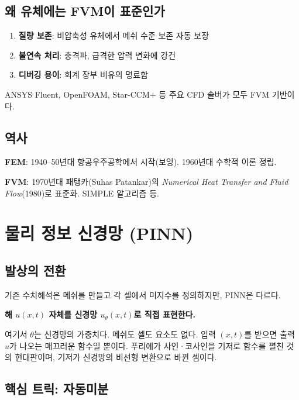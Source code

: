\documentclass[11pt,a4paper]{article}
\begin{document}
\subsection{왜 유체에는 FVM이 표준인가}

\begin{enumerate}[leftmargin=*, itemsep=1pt]
  \item \textbf{질량 보존}: 비압축성 유체에서 메쉬 수준 보존 자동 보장
  \item \textbf{불연속 처리}: 충격파, 급격한 압력 변화에 강건
  \item \textbf{디버깅 용이}: 회계 장부 비유의 명료함
\end{enumerate}

ANSYS Fluent, OpenFOAM, Star-CCM+ 등 주요 CFD 솔버가 모두 FVM 기반이다.

\subsection{역사}

\textbf{FEM}: 1940--50년대 항공우주공학에서 시작(보잉). 1960년대 수학적 이론 정립.

\textbf{FVM}: 1970년대 패탱카(Suhas Patankar)의 \emph{Numerical Heat Transfer and Fluid Flow}(1980)로 표준화. SIMPLE 알고리즘 등.

\section{물리 정보 신경망 (PINN)}

\subsection{발상의 전환}

기존 수치해석은 메쉬를 만들고 각 셀에서 미지수를 정의하지만, PINN은 다르다.

\begin{quotebox}
\textbf{해 $u(x, t)$ 자체를 신경망 $u_\theta(x, t)$로 직접 표현한다.}
\end{quotebox}

여기서 $\theta$는 신경망의 가중치다. 메쉬도 셀도 요소도 없다. 입력 $(x, t)$를 받으면 출력 $u$가 나오는 매끄러운 함수일 뿐이다. 푸리에가 사인·코사인을 기저로 함수를 펼친 것의 현대판이며, 기저가 신경망의 비선형 변환으로 바뀐 셈이다.

\subsection{핵심 트릭: 자동미분}
\end{document}
